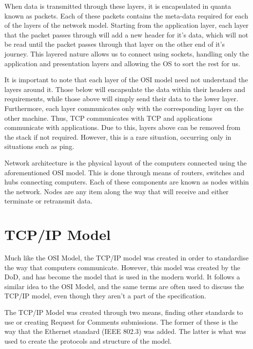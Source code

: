 \documentclass[a4paper,11pt]{report}
\begin{document}
		When data is transmitted through these layers, it is encapsulated in quanta known as packets. 
		Each of these packets contains the meta-data required for each of the layers of the network model. 
		Starting from the application layer, each layer that the packet passes through will add a new header for it's data, which will not be read until the packet passes through that layer on the other end of it's journey. 
		This layered nature allows us to connect using sockets, handling only the application and presentation layers and allowing the OS to sort the rest for us.

		It is important to note that each layer of the OSI model need not understand the layers around it. 
		Those below will encapsulate the data within their headers and requirements, while those above will simply send their data to the lower layer. 
		Furthermore, each layer communicates only with the corresponding layer on the other machine. 
		Thus, TCP communicates with TCP and applications communicate with applications. 
		Due to this, layers above can be removed from the stack if not required. 
		However, this is a rare situation, occurring only in situations such as ping. 

		Network architecture is the physical layout of the computers connected using the aforementioned OSI model. 
		This is done through means of routers, switches and hubs connecting computers. 
		Each of these components are known as nodes within the network. 
		Nodes are any item along the way that will receive and either terminate or retransmit data. 

	\section{TCP/IP Model}
		Much like the OSI Model, the TCP/IP model was created in order to standardise the way that computers communicate.\cite{ICND1}
		However, this model was created by the DoD, and has become the model that is used in the modern world. 
		It follows a similar idea to the OSI Model, and the same terms are often used to discuss the TCP/IP model, even though they aren't a part of the specification. 
	
		The TCP/IP Model was created through two means, finding other standards to use or creating Request for Comments submissions. 
		The former of these is the way that the Ethernet standard (IEEE 802.3) was added. 
		The latter is what was used to create the protocols and structure of the model. 
\end{document}
